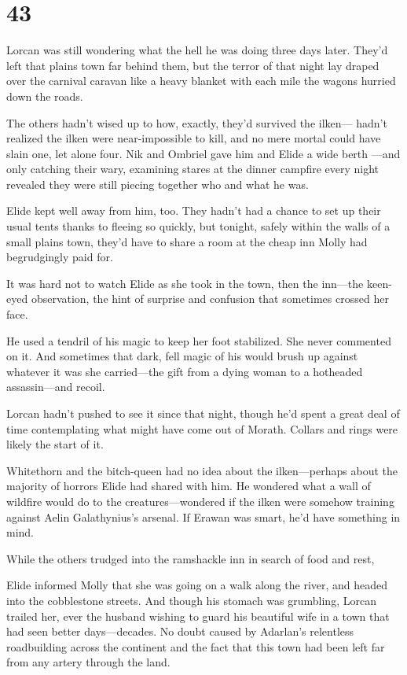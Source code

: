 
\chapter{43}

Lorcan was still wondering what the hell he was doing three days later. They'd left that plains town far behind them, but the terror of that night lay draped over the carnival caravan like a heavy blanket with each mile the wagons hurried down the roads.

The others hadn't wised up to how, exactly, they'd survived the ilken--- hadn't realized the ilken were near-impossible to kill, and no mere mortal could have slain one, let alone four. Nik and Ombriel gave him and Elide a wide berth ---and only catching their wary, examining stares at the dinner campfire every night revealed they were still piecing together who and what he was.

Elide kept well away from him, too. They hadn't had a chance to set up their usual tents thanks to fleeing so quickly, but tonight, safely within the walls of a small plains town, they'd have to share a room at the cheap inn Molly had begrudgingly paid for.

It was hard not to watch Elide as she took in the town, then the inn---the keen-eyed observation, the hint of surprise and confusion that sometimes crossed her face.

He used a tendril of his magic to keep her foot stabilized. She never commented on it. And sometimes that dark, fell magic of his would brush up against whatever it was she carried---the gift from a dying woman to a hotheaded assassin---and recoil.

Lorcan hadn't pushed to see it since that night, though he'd spent a great deal of time contemplating what might have come out of Morath. Collars and rings were likely the start of it.

Whitethorn and the bitch-queen had no idea about the ilken---perhaps about the majority of horrors Elide had shared with him. He wondered what a wall of wildfire would do to the creatures---wondered if the ilken were somehow training against Aelin Galathynius's arsenal. If Erawan was smart, he'd have something in mind.

While the others trudged into the ramshackle inn in search of food and rest,

Elide informed Molly that she was going on a walk along the river, and headed into the cobblestone streets. And though his stomach was grumbling, Lorcan trailed her, ever the husband wishing to guard his beautiful wife in a town that had seen better days---decades. No doubt caused by Adarlan's relentless roadbuilding across the continent and the fact that this town had been left far from any artery through the land.

